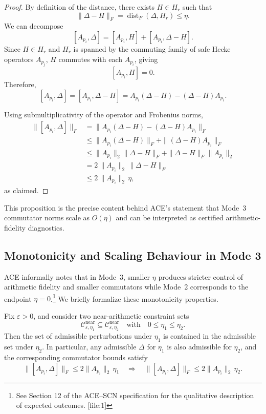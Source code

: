 \documentclass[11pt]{article}
\begin{document}
\begin{proof}
By definition of the distance, there exists \(H\in H_r\) such that
\[
\|\Delta - H\|_F = \operatorname{dist}_F(\Delta,H_r) \le \eta.
\]
We can decompose
\[
[A_{p_i},\Delta] = [A_{p_i},H] + [A_{p_i},\Delta - H].
\]
Since \(H\in H_r\) and \(H_r\) is spanned by the commuting family of safe Hecke operators \(A_{p_j}\), \(H\) commutes with each \(A_{p_i}\), giving
\[
[A_{p_i},H] = 0.
\]
Therefore,
\[
[A_{p_i},\Delta] = [A_{p_i},\Delta - H] = A_{p_i}(\Delta-H) - (\Delta-H)A_{p_i}.
\]

Using submultiplicativity of the operator and Frobenius norms,
\begin{align*}
\|[A_{p_i},\Delta]\|_F
  &= \|A_{p_i}(\Delta-H) - (\Delta-H)A_{p_i}\|_F \\
  &\le \|A_{p_i}(\Delta-H)\|_F + \|(\Delta-H)A_{p_i}\|_F \\
  &\le \|A_{p_i}\|_2 \|\Delta-H\|_F + \|\Delta-H\|_F \|A_{p_i}\|_2 \\
  &= 2\,\|A_{p_i}\|_2\,\|\Delta - H\|_F \\
  &\le 2\,\|A_{p_i}\|_2\,\eta,
\end{align*}
as claimed.
\end{proof}

This proposition is the precise content behind ACE's statement that Mode~3 commutator norms scale as \(O(\eta)\) and can be interpreted as certified arithmetic-fidelity diagnostics.

\subsection{Monotonicity and Scaling Behaviour in Mode 3}

ACE informally notes that in Mode~3, smaller \(\eta\) produces stricter control of arithmetic fidelity and smaller commutators while Mode~2 corresponds to the endpoint \(\eta = 0\).\footnote{See Section 12 of the ACE--SCN specification for the qualitative description of expected outcomes. [file:1]} We briefly formalize these monotonicity properties.

\begin{lemma}\label{lem:eta-monotone}
Fix \(\varepsilon>0\), and consider two near-arithmetic constraint sets
\[
\mathcal{C}^{\mathrm{near}}_{\varepsilon,\eta_1}
  \subseteq
\mathcal{C}^{\mathrm{near}}_{\varepsilon,\eta_2}
\quad\text{with}\quad
0 \le \eta_1 \le \eta_2.
\]
Then the set of admissible perturbations under \(\eta_1\) is contained in the admissible set under \(\eta_2\). In particular, any admissible \(\Delta\) for \(\eta_1\) is also admissible for \(\eta_2\), and the corresponding commutator bounds satisfy
\[
\|[A_{p_i},\Delta]\|_F \le 2\|A_{p_i}\|_2\,\eta_1
\quad\Rightarrow\quad
\|[A_{p_i},\Delta]\|_F \le 2\|A_{p_i}\|_2\,\eta_2.
\]
\end{lemma}
\end{document}
